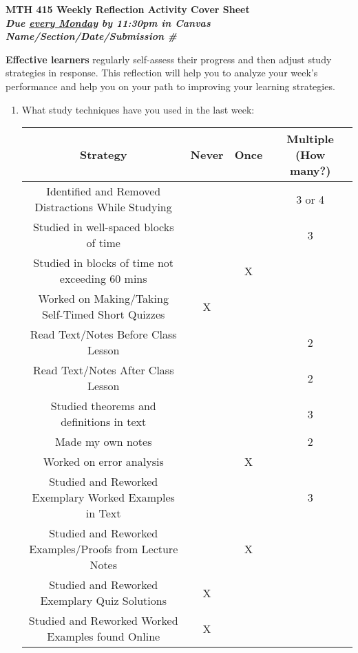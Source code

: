 \documentclass[10pt]{article}
\begin{document}
\begin{center}
\Large \bfseries MTH 415 Weekly Reflection Activity Cover Sheet\\ 
{\it Due \underline{every Monday} by 11:30pm in Canvas}\\ 
\smallskip
\it Name/Section/Date/Submission \# 
\end{center}

{\bf Effective learners} regularly self-assess their progress and then adjust study strategies in response. This reflection will help you to analyze your week's performance and help you on your path to improving your learning strategies.

\begin{enumerate}

\item What study techniques have you used in the last week:\\
	
	\begin{tabular}{|c|c|c|c|}
		\hline
		 {\bf Strategy} & {\bf Never} & {\bf Once} & {\bf Multiple (How many?)}\\
		\hline
		Identified and Removed Distractions While Studying &&&3 or 4\\
		\hline
		Studied in well-spaced blocks of time &&&3\\
		\hline
		Studied in blocks of time not exceeding 60 mins &&X&\\
		\hline
		Worked on Making/Taking Self-Timed Short Quizzes &X&&\\
		\hline
		\hline
		Read Text/Notes Before Class Lesson &&&2\\
		\hline
		Read Text/Notes After Class Lesson &&&2\\
		\hline
		\hline

		Studied theorems and definitions in text&&&3\\
		\hline 
		Made my own notes&&&2\\
		\hline 
		Worked on error analysis&&X&\\
		\hline 
		\hline
		 
		Studied and Reworked Exemplary Worked Examples in Text &&&3\\
		\hline 
		Studied and Reworked Examples/Proofs from Lecture Notes &&X&\\
		\hline 
		Studied and Reworked Exemplary Quiz Solutions &X&&\\
		\hline 
		Studied and Reworked Worked Examples found Online &X&&\\
		\hline 
		\hline
		

\end{tabular}
\end{enumerate}
\end{document}
